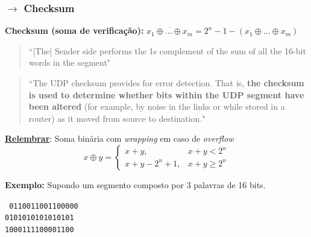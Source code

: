 \subsubsection[3.3.1 Checksum]{$\pmb{\rightarrow}$ Checksum}
\label{subsubsec:checksum}

\begin{mdframed}
    \begin{center}
        \textbf{Checksum (soma de verificação):} $\overline{x_1 \oplus \dots \oplus x_m} = 2^n - 1 - \left(x_1 \oplus \dots \oplus x_m \right)$
    \end{center}
    \vspace{-0.5em}
    \begin{quote}
        ``$[$The$]$ Sender side performs the 1s complement of the sum of all the 16-bit words in the segment"\cite{Kurose2017}
    \end{quote}
\end{mdframed}

\begin{quote}
    ``The UDP checksum provides for error detection. That is, \textbf{the checksum is used to determine whether bits within the UDP segment have been altered} (for example, by noise in the links or while stored in a router) as it moved from source to destination."\cite{Kurose2017}
\end{quote}

\noindent \underline{\textbf{Relembrar}}: Soma binária com \textit{wrapping} em caso de \textit{overflow}
$$
    x \oplus y = 
    \begin{cases}
        x + y, & x + y < 2^n \\
        x + y - 2^n + 1, &  x + y \ge 2^n
    \end{cases}
$$

\newpage
\noindent \textbf{Exemplo:} Supondo um segmento composto por 3 palavras de 16 bits. 

\begin{center}\texttt{%
    0110011001100000 \\
    0101010101010101 \\
    1000111100001100
    }
\end{center}

